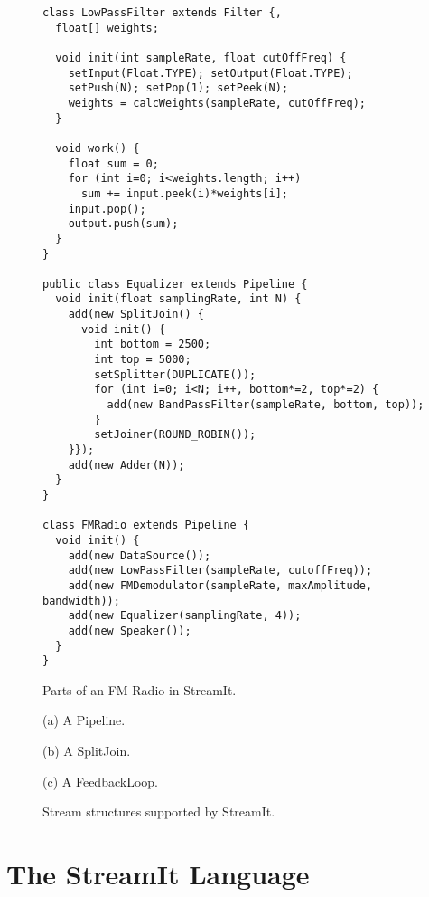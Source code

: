 \begin{figure}[t]
\centering
\scriptsize
\begin{verbatim}
class LowPassFilter extends Filter {,
  float[] weights;

  void init(int sampleRate, float cutOffFreq) {
    setInput(Float.TYPE); setOutput(Float.TYPE);
    setPush(N); setPop(1); setPeek(N); 
    weights = calcWeights(sampleRate, cutOffFreq);
  }

  void work() {
    float sum = 0;
    for (int i=0; i<weights.length; i++) 
      sum += input.peek(i)*weights[i];
    input.pop();
    output.push(sum);
  }
}

public class Equalizer extends Pipeline {
  void init(float samplingRate, int N) {
    add(new SplitJoin() {
      void init() {
        int bottom = 2500;
        int top = 5000;
        setSplitter(DUPLICATE());
        for (int i=0; i<N; i++, bottom*=2, top*=2) {
          add(new BandPassFilter(sampleRate, bottom, top));
        }
        setJoiner(ROUND_ROBIN());
    }});
    add(new Adder(N));
  }
}
  
class FMRadio extends Pipeline {
  void init() {
    add(new DataSource());
    add(new LowPassFilter(sampleRate, cutoffFreq));
    add(new FMDemodulator(sampleRate, maxAmplitude, bandwidth));
    add(new Equalizer(samplingRate, 4));
    add(new Speaker());
  }
}
\end{verbatim}
\caption{Parts of an FM Radio in StreamIt.
\protect\label{fig:radiocode}}
\end{figure}

\begin{figure}[t]
\centering
\vspace{10pt}

(a) A Pipeline. \\
\vspace{10pt}

(b) A SplitJoin. \\
\vspace{10pt}

(c) A FeedbackLoop. \\
\caption{\protect\small Stream structures supported by StreamIt.
\protect\label{fig:structures}
}
\end{figure}

\section{The StreamIt Language}
\label{sec:streamit}

